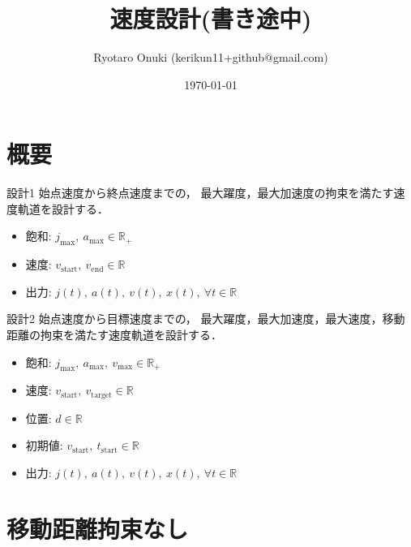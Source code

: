\documentclass[a5paper]{ltjsarticle}
\title{速度設計(書き途中)}
\author{Ryotaro Onuki (kerikun11+github@gmail.com)}
\date{\today}
\begin{document}
\maketitle
\section{概要}
\begin{itembox}[l]{設計1}
    \quad
    始点速度から終点速度までの，
    最大躍度，最大加速度の拘束を満たす速度軌道を設計する．
    \begin{itemize}
        \item 飽和: $j_{\max},~ a_{\max} \in \mathbb{R}_+$
        \item 速度: $v_\mathrm{start},~ v_\mathrm{end} \in \mathbb{R}$
        \item 出力: $j(t),~ a(t),~ v(t),~ x(t),~ \forall t \in \mathbb{R}$
    \end{itemize}
\end{itembox}
\begin{itembox}[l]{設計2}
    \quad
    始点速度から目標速度までの，
    最大躍度，最大加速度，最大速度，移動距離の拘束を満たす速度軌道を設計する．
    \begin{itemize}
        \item 飽和: $j_{\max},~ a_{\max},~ v_{\max} \in \mathbb{R}_+$
        \item 速度: $v_\mathrm{start},~ v_\mathrm{target} \in \mathbb{R}$
        \item 位置: $d \in \mathbb{R}$
        \item 初期値: $v_\mathrm{start},~ t_\mathrm{start} \in \mathbb{R}$
        \item 出力: $j(t),~ a(t),~ v(t),~ x(t),~ \forall t \in \mathbb{R}$
    \end{itemize}
\end{itembox}
\section{移動距離拘束なし}
\end{document}
